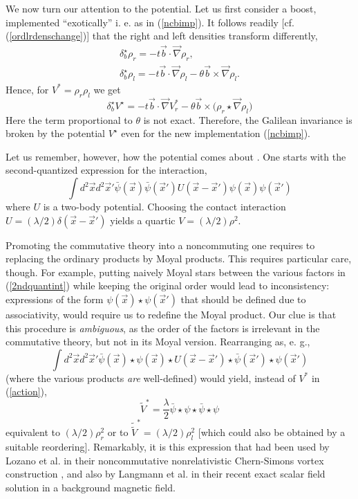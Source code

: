 \documentclass[a4paper,11pt]{article}
\def\vb{{\vec b}}
\def\vx{{\vec x}}
\def\vnabla{{\vec\nabla}}
\begin{document}
We now turn our attention to the potential.
  Let us first consider a boost, implemented ``exotically''
i. e. as in (\ref{ncbimp}).
It follows readily [cf. (\ref{ordlrdenschange})]
that the right and left densities  transform differently,
\begin{equation}
     \begin{array}{ll}
\delta^{\star}_{b}\rho_{r}=-t\vb\cdot\vnabla\rho_{r},
\\[8pt]
\delta^{\star}_{b}\rho_{l}=
-t\vb\cdot\vnabla\rho_{l}
-\theta\vb\times\vnabla\rho_{l}.
\end{array}
\label{denschange}
\end{equation}
Hence, for $V^*=\rho_{r}\rho_{l}$ we get
\begin{equation}
\delta^{\star}_{b}V^{\star}
=-t\vb\cdot\vnabla V^*_{r}
-\theta\vb\times\big(\rho_{r}\star\vnabla\rho_{l}\big)
\end{equation}
  Here the term proportional to $\theta$ is
not exact. Therefore, the Galilean invariance
is broken by the potential $V^{\star}$
even for the new implementation
(\ref{ncbimp}).

Let us remember, however, how the potential comes about \cite{LiPi}.
One starts with the second-quantized  expression for the interaction,
\begin{equation}
     \int
     d^2\vx d^2\vx'\bar{\psi}(\vx)\bar{\psi}(\vx')U(\vx-\vx')
     \psi(\vx)\psi(\vx')
     \label{2ndquantint}
\end{equation}
where $U$ is a two-body potential. Choosing the contact interaction
$U=(\lambda/2)\delta(\vx-\vx')$ yields a quartic $V=(\lambda/2)\rho^2$.

Promoting the commutative theory into a noncommuting one
requires to replacing the ordinary products by Moyal products.
This requires particular care, though. For example, putting
naively Moyal stars between the various factors in
(\ref{2ndquantint}) while keeping the original order
would lead to inconsistency: expressions of the
form $\psi(\vx)\star\psi(\vx')$ that should be defined
due to associativity, would require us to
redefine the Moyal product.
Our clue is that this procedure is {\it ambiguous},
as the order of the factors is irrelevant in the
commutative theory, but not in its Moyal version.
  Rearranging as, e. g.,
\begin{equation}
     \int
     d^2\vx d^2\vx'
     \bar{\psi}(\vx)\star\psi(\vx)
     \star U(\vx-\vx')\star\bar{\psi}(\vx')\star\psi(\vx')
     \label{rearrangedpot}
\end{equation}
(where the various products {\it are} well-defined)
would yield, instead of $V^*$ in (\ref{action}),
\begin{equation}
     \widetilde{V}^*=\frac{\lambda}{2}
     \bar{\psi}\star\psi\star\bar{\psi}\star\psi
     \label{ourpot}
\end{equation}
equivalent to $(\lambda/2)\rho_{r}^2$ or to
$\widetilde{\widetilde{V}}^*=(\lambda/2)\rho_{l}^2$
[which could also be obtained by a suitable reordering].
Remarkably, it is this expression that had been used by
Lozano et al. in their noncommutative nonrelativistic
Chern-Simons vortex construction \cite{Schap},
and also by Langmann et al. \cite{Langmann}
in their recent exact scalar field solution in a
background magnetic field.
\end{document}
